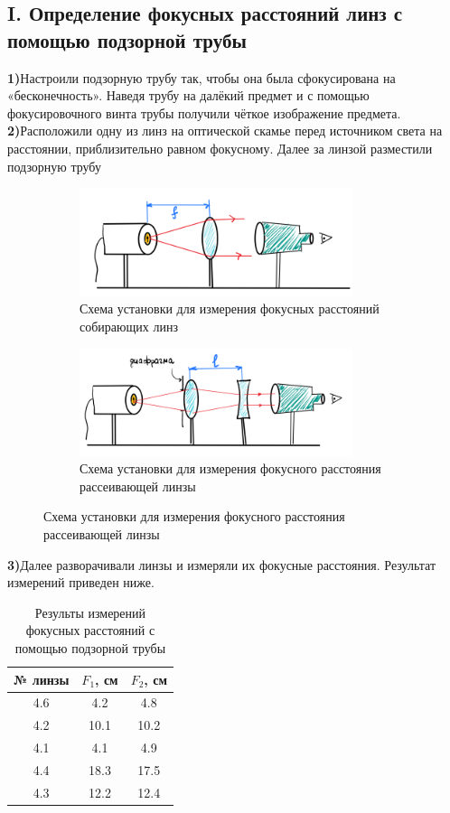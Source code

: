 \subsection*{I. Определение фокусных расстояний линз с помощью подзорной трубы}

\indent \textbf{1)}Настроили подзорную трубу так, чтобы она была сфокусирована на «бесконечность». Наведя трубу на далёкий предмет и с помощью фокусировочного винта трубы получили чёткое изображение предмета.\\

\indent \textbf{2)}Расположили одну из линз на оптической скамье перед источником света на расстоянии, приблизительно равном фокусному. Далее за линзой разместили подзорную трубу \\

\begin{figure}[h!]
    \centering
    \begin{subfigure}{0.45\linewidth}
        \centering
        \includegraphics[width=8cm]{images/setup1.png}
        \caption{Схема установки для измерения фокусных расстояний собирающих линз}
    \end{subfigure}
    \hfill
    \begin{subfigure}{0.45\linewidth}
        \centering
        \includegraphics[width=8cm]{images/setup1(2).png}
        \caption{Схема установки для измерения фокусного расстояния рассеивающей линзы}
    \end{subfigure}
\end{figure}

\indent \textbf{3)}Далее разворачивали линзы и измеряли их фокусные расстояния. Результат измерений приведен ниже.

\begin{table}[h]
    \centering
    \begin{tabular}{|c|c|c|}
        \hline
        № линзы & $F_1$, см   & $F_2$, см   \\ \hline
        4.6     & 4.2       & 4.8       \\ \hline
        4.2     & 10.1      & 10.2      \\ \hline
        4.1     & 4.1       & 4.9       \\ \hline
        4.4     & 18.3      & 17.5      \\ \hline
        4.3     & 12.2      & 12.4      \\ \hline
    \end{tabular}
    \caption{Результы измерений фокусных расстояний с помощью подзорной трубы}
\end{table}

